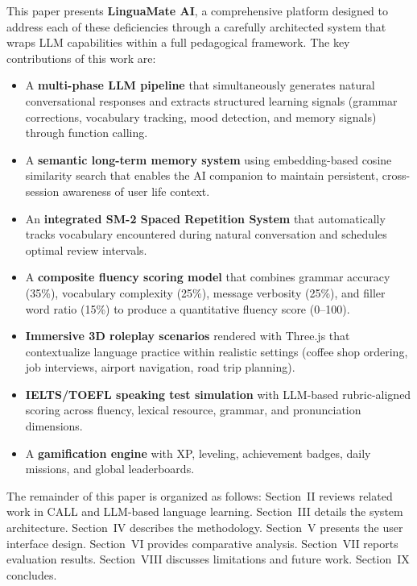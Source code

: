 \documentclass[conference]{IEEEtran}
\begin{document}
This paper presents \textbf{LinguaMate AI}, a comprehensive platform designed to address each of these deficiencies through a carefully architected system that wraps LLM capabilities within a full pedagogical framework. The key contributions of this work are:

\begin{itemize}[leftmargin=*]
    \item A \textbf{multi-phase LLM pipeline} that simultaneously generates natural conversational responses and extracts structured learning signals (grammar corrections, vocabulary tracking, mood detection, and memory signals) through function calling.
    \item A \textbf{semantic long-term memory system} using embedding-based cosine similarity search that enables the AI companion to maintain persistent, cross-session awareness of user life context.
    \item An \textbf{integrated SM-2 Spaced Repetition System} that automatically tracks vocabulary encountered during natural conversation and schedules optimal review intervals.
    \item A \textbf{composite fluency scoring model} that combines grammar accuracy (35\%), vocabulary complexity (25\%), message verbosity (25\%), and filler word ratio (15\%) to produce a quantitative fluency score (0--100).
    \item \textbf{Immersive 3D roleplay scenarios} rendered with Three.js that contextualize language practice within realistic settings (coffee shop ordering, job interviews, airport navigation, road trip planning).
    \item \textbf{IELTS/TOEFL speaking test simulation} with LLM-based rubric-aligned scoring across fluency, lexical resource, grammar, and pronunciation dimensions.
    \item A \textbf{gamification engine} with XP, leveling, achievement badges, daily missions, and global leaderboards.
\end{itemize}

The remainder of this paper is organized as follows: Section~II reviews related work in CALL and LLM-based language learning. Section~III details the system architecture. Section~IV describes the methodology. Section~V presents the user interface design. Section~VI provides comparative analysis. Section~VII reports evaluation results. Section~VIII discusses limitations and future work. Section~IX concludes.

\end{document}
